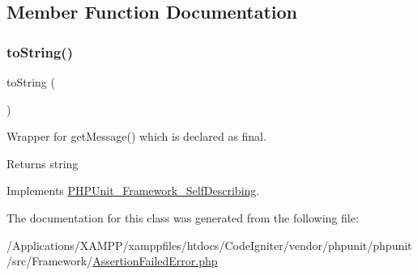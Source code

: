\subsection{Member Function Documentation}
\mbox{\label{class_p_h_p_unit___framework___assertion_failed_error_a5558c5d549f41597377fa1ea8a1cefa3}} 
\subsubsection{\texorpdfstring{to\+String()}{toString()}}
{\footnotesize\ttfamily to\+String (\begin{DoxyParamCaption}{ }\end{DoxyParamCaption})}

Wrapper for get\+Message() which is declared as final.

\begin{DoxyReturn}{Returns}
string 
\end{DoxyReturn}


Implements \mbox{\hyperlink{interface_p_h_p_unit___framework___self_describing_a5558c5d549f41597377fa1ea8a1cefa3}{P\+H\+P\+Unit\+\_\+\+Framework\+\_\+\+Self\+Describing}}.



The documentation for this class was generated from the following file\+:\begin{DoxyCompactItemize}
\item 
/\+Applications/\+X\+A\+M\+P\+P/xamppfiles/htdocs/\+Code\+Igniter/vendor/phpunit/phpunit/src/\+Framework/\mbox{\hyperlink{_framework_2_assertion_failed_error_8php}{Assertion\+Failed\+Error.\+php}}\end{DoxyCompactItemize}
